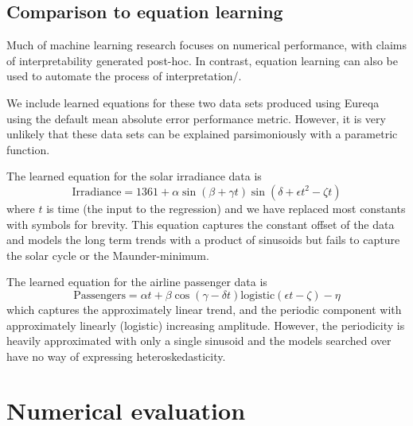\documentclass{article}
\begin{document}
\subsection{Comparison to equation learning}

Much of machine learning research focuses on numerical performance, with claims of interpretability generated post-hoc.
In contrast, equation learning \citep{Schmidt2009b} can also be used to automate the process of interpretation/.

We include learned equations for these two data sets produced using Eureqa \citep{Eureqa} using the default mean absolute error performance metric\footnotemark.
However, it is very unlikely that these data sets can be explained parsimoniously with a parametric function.

The learned equation for the solar irradiance data is
\begin{equation}
\textrm{Irradiance} = 1361 + \alpha\sin(\beta + \gamma t)\sin(\delta + \epsilon t^2 - \zeta t)
\end{equation}
where $t$ is time (the input to the regression) and we have replaced most constants with symbols for brevity.
This equation captures the constant offset of the data and models the long term trends with a product of sinusoids but fails to capture the solar cycle or the Maunder-minimum.

The learned equation for the airline passenger data is
\begin{equation}
\textrm{Passengers} = \alpha t + \beta\cos(\gamma - \delta t)\textrm{logistic}(\epsilon t - \zeta) - \eta
\end{equation}
which captures the approximately linear trend, and the periodic component with approximately linearly (logistic) increasing amplitude.
However, the periodicity is heavily approximated with only a single sinusoid and the models searched over have no way of expressing heteroskedasticity.

\section{Numerical evaluation}
\label{sec:numerical}
\end{document}
